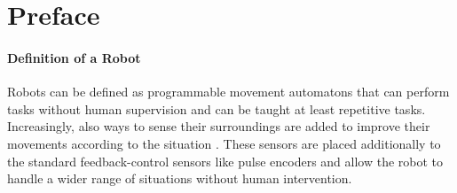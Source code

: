 \section{Preface}

\paragraph{Definition of a Robot}
Robots \cite{robotDef} can be defined as programmable movement automatons \cite{automatonDef} that can perform tasks without human supervision and can be taught at least repetitive tasks. 
Increasingly, also ways to sense their surroundings are added to improve their movements according to the situation \cite{robotDef2}. 
These sensors are placed additionally to the standard feedback-control sensors like pulse encoders and allow the robot to handle a wider range of situations without human intervention. %
\medskip


